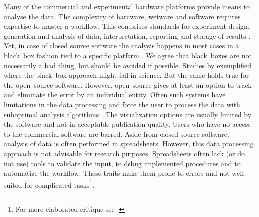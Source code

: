 Many of the commercial and experimental hardware platforms provide means to 
analyse the data. The complexity of hardware, wetware and software 
requires expertise to master a workflow. This comprises standards for experiment 
design, generation and analysis of data, interpretation, reporting and storage 
of results \citep{huggett_BDQ_2014}. Yet, in case of closed source software the 
analysis happens in most cases in a black~box fashion tied to a specific 
platform \citep{roediger_RJ_2013}. We agree that black~boxes are not necessarily 
a bad thing, but should be avoided if possible. Studies by 
\citet{mccullough_2008, Almiron_2010, Duran_2014} exemplified where the 
black~box approach might fail in science. But the same holds true for the 
open~source software. However, open~source gives at least an option to track and 
eliminate  the error by an individual entity. Often such systems have 
limitations in the data processing and force the user to process the data with 
suboptimal analysis algorithms \citep{ruijter_2013}. The visualization options 
are usually limited by the software and not in acceptable publication quality. 
Users who have no access to the commercial software are barred. Aside from 
closed source software, analysis of data is often performed in spreadsheets. 
However, this data processing approach is not advisable for research purposes. 
Spreadsheets often lack (or do not use) tools to validate the input, to debug 
implemented procedures and to automatize the workflow. These traits make them 
prone to errors and not well suited for complicated tasks\footnote{For more 
elaborated critique see \citet{mccullough_2008, burns_2014}.}.

